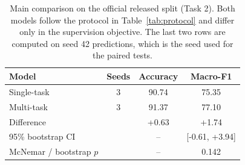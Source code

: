 \begin{table}[t]
\caption{Main comparison on the official released split (Task 2). Both models follow the protocol in Table~\ref{tab:protocol} and differ only in the supervision objective. The last two rows are computed on seed 42 predictions, which is the seed used for the paired tests.}
\label{tab:main}
\centering
\small
\begin{tabular}{@{}lccc@{}}
\toprule
Model & Seeds & Accuracy & Macro-F1 \\
\midrule
Single-task \phobert{} & 3 & 90.74 & 75.35 \\
Multi-task \phobert{} & 3 & 91.37 & 77.10 \\
\midrule
Difference & & +0.63 & +1.74 \\
95\% bootstrap CI & & -- & [-0.61, +3.94] \\
McNemar / bootstrap $p$ & & -- & 0.142 \\

\bottomrule
\end{tabular}
\end{table}
